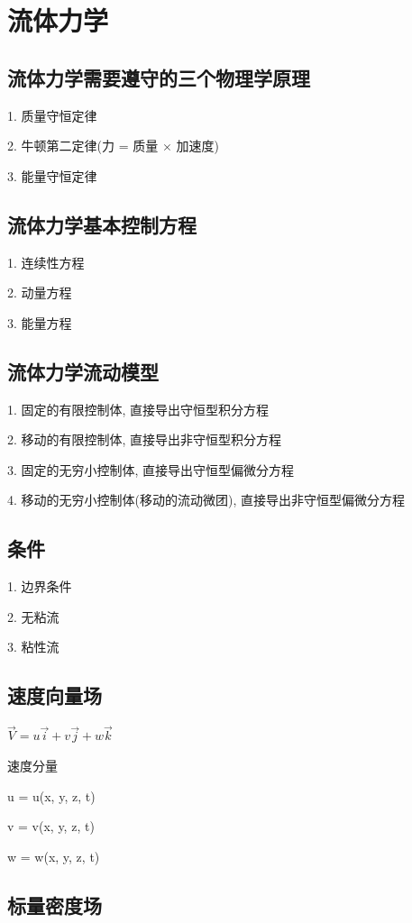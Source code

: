 \documentclass[UTF8]{ctexart}
\begin{document}
\section{流体力学}

\subsection{流体力学需要遵守的三个物理学原理}

1. 质量守恒定律

2. 牛顿第二定律(力 = 质量 $\times$ 加速度)

3. 能量守恒定律

\subsection{流体力学基本控制方程}

1. 连续性方程

2. 动量方程

3. 能量方程

\subsection{流体力学流动模型}

1. 固定的有限控制体, 直接导出守恒型积分方程

2. 移动的有限控制体, 直接导出非守恒型积分方程

3. 固定的无穷小控制体, 直接导出守恒型偏微分方程

4. 移动的无穷小控制体(移动的流动微团), 直接导出非守恒型偏微分方程

\subsection{条件}
1. 边界条件

2. 无粘流

3. 粘性流

\subsection{速度向量场}

$\vec{V} = u\vec{i} + v\vec{j} + w\vec{k}$

速度分量

u = u(x, y, z, t)

v = v(x, y, z, t)

w = w(x, y, z, t)

\subsection{标量密度场}
\end{document}
